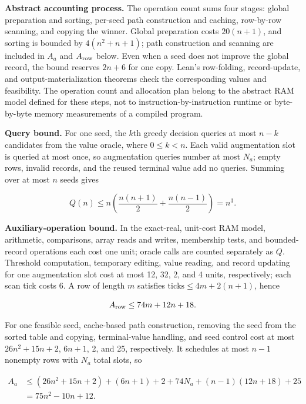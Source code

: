 \documentclass[11pt,a4paper]{article}
\begin{document}
\textbf{Abstract accounting process.} The operation count sums four stages: global preparation and sorting, per-seed path construction and caching, row-by-row scanning, and copying the winner. Global preparation costs $20(n+1)$, and sorting is bounded by $4(n^2+n+1)$; path construction and scanning are included in $A_a$ and $A_{\rm row}$ below. Even when a seed does not improve the global record, the bound reserves $2n+6$ for one copy. Lean's row-folding, record-update, and output-materialization theorems check the corresponding values and feasibility. The operation count and allocation plan belong to the abstract RAM model defined for these steps, not to instruction-by-instruction runtime or byte-by-byte memory measurements of a compiled program.

\textbf{Query bound.} For one seed, the $k$th greedy decision queries at most $n-k$ candidates from the value oracle, where $0\le k<n$. Each valid augmentation slot is queried at most once, so augmentation queries number at most $N_a$; empty rows, invalid records, and the reused terminal value add no queries. Summing over at most $n$ seeds gives

\begin{equation}
Q(n)\le n\left(\frac{n(n+1)}2+\frac{n(n-1)}2\right)=n^3.
\tag{12.2}
\end{equation}

\textbf{Auxiliary-operation bound.} In the exact-real, unit-cost RAM model, arithmetic, comparisons, array reads and writes, membership tests, and bounded-record operations each cost one unit; oracle calls are counted separately as $Q$. Threshold computation, temporary editing, value reading, and record updating for one augmentation slot cost at most 12, 32, 2, and 4 units, respectively; each scan tick costs 6. A row of length $m$ satisfies $\mathrm{ticks}\le4m+2(n+1)$, hence

\[
A_{\rm row}\le74m+12n+18.
\]

For one feasible seed, cache-based path construction, removing the seed from the sorted table and copying, terminal-value handling, and seed control cost at most $26n^2+15n+2$, $6n+1$, 2, and 25, respectively. It schedules at most $n-1$ nonempty rows with $N_a$ total slots, so

\[
\begin{aligned}
A_a&\le(26n^2+15n+2)+(6n+1)+2
       +74N_a+(n-1)(12n+18)+25\\
   &=75n^2-10n+12.
\end{aligned}
\]
\end{document}
